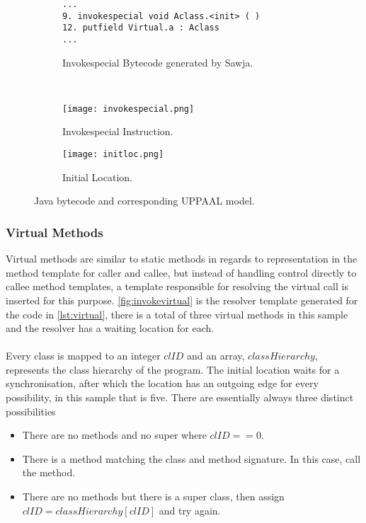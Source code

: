 \begin{figure}[H]
\centering
\begin{subfigure}{\textwidth}
  \begin{lstlisting}
...
9. invokespecial void Aclass.<init> ( )
12. putfield Virtual.a : Aclass
...
  \end{lstlisting}
  \caption{Invokespecial Bytecode generated by Sawja.}
\end{subfigure} \\
\begin{subfigure}{.65\textwidth}
  \texttt{[image: invokespecial.png]}
  \caption{Invokespecial Instruction.}
\end{subfigure}
\hspace{10px}
\begin{subfigure}{.25\textwidth}
  \texttt{[image: initloc.png]}
  \caption{Initial Location.}
\end{subfigure}
\caption{Java bytecode and corresponding UPPAAL model.}
\label{fig:invokespecial}
\end{figure}


\subsubsection{Virtual Methods}
Virtual methods are similar to static methods in regards to representation in the method template for caller and callee, but instead of handling control directly to callee method templates, a template responsible for resolving the virtual call is inserted for this purpose.
\cref{fig:invokevirtual} is the resolver template generated for the code in \cref{lst:virtual}, there is a total of three virtual methods in this sample and the resolver has a waiting location for each.\\\\
Every class is mapped to an integer $clID$ and an array, $classHierarchy$, represents the class hierarchy of the program. The initial location  waits for a synchronisation, after which the location  has an outgoing edge for every possibility, in this sample that is five. There are essentially always three distinct possibilities 

\begin{itemize}
\item There are no methods and no super where $clID == 0$.
\item There is a method matching the class and method signature. In this case, call the method.
\item There are no methods but there is a super class, then assign $clID = classHierarchy[clID]$ and try again.
\end{itemize}

